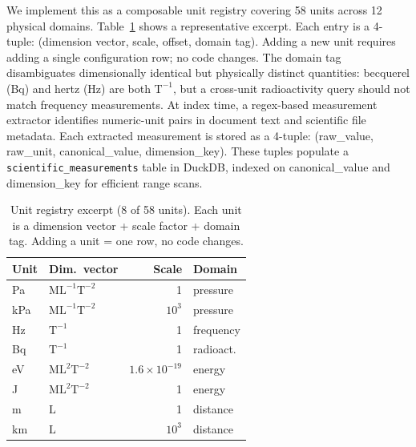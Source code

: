 We implement this as a composable unit registry covering 58 units across 12 physical domains. Table~\ref{tab:si_conversion} shows a representative excerpt. Each entry is a 4-tuple: (dimension vector, scale, offset, domain tag). Adding a new unit requires adding a single configuration row; no code changes. The domain tag disambiguates dimensionally identical but physically distinct quantities: becquerel (Bq) and hertz (Hz) are both $\text{T}^{-1}$, but a cross-unit radioactivity query should not match frequency measurements. At index time, a regex-based measurement extractor identifies numeric-unit pairs in document text and scientific file metadata. Each extracted measurement is stored as a 4-tuple: (raw\_value, raw\_unit, canonical\_value, dimension\_key). These tuples populate a \texttt{scientific\_measurements} table in DuckDB, indexed on canonical\_value and dimension\_key for efficient range scans.

\begin{table}[!t]
\centering
\caption{Unit registry excerpt (8 of 58 units). Each unit is a dimension vector + scale factor + domain tag. Adding a unit = one row, no code changes.}
\label{tab:si_conversion}
\footnotesize
\setlength{\tabcolsep}{3pt}
\renewcommand{\arraystretch}{1.2}
\begin{tabular}{@{}l l r l@{}}
\toprule
\textbf{Unit} & \textbf{Dim.\ vector} & \textbf{Scale} & \textbf{Domain} \\
\midrule
Pa  & $\text{M}\text{L}^{-1}\text{T}^{-2}$ & 1              & pressure \\
\rowcolor{gray!5}
kPa & $\text{M}\text{L}^{-1}\text{T}^{-2}$ & $10^{3}$       & pressure \\
Hz  & $\text{T}^{-1}$                       & 1              & frequency \\
\rowcolor{gray!5}
Bq  & $\text{T}^{-1}$                       & 1              & radioact. \\
eV  & $\text{M}\text{L}^{2}\text{T}^{-2}$  & $1.6\!\times\!10^{-19}$ & energy \\
\rowcolor{gray!5}
J   & $\text{M}\text{L}^{2}\text{T}^{-2}$  & 1              & energy \\
m   & $\text{L}$                             & 1              & distance \\
\rowcolor{gray!5}
km  & $\text{L}$                             & $10^{3}$       & distance \\
\bottomrule
\end{tabular}
\renewcommand{\arraystretch}{1.15}
\end{table}

